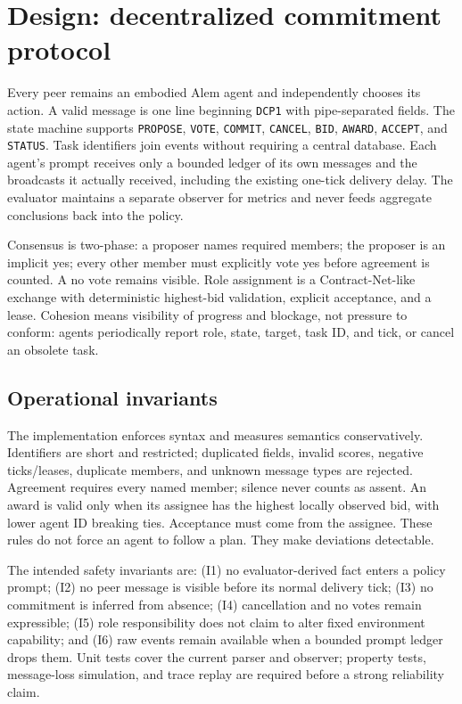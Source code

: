 \documentclass[11pt]{article}
\begin{document}
\section{Design: decentralized commitment protocol}
Every peer remains an embodied Alem agent and independently chooses its action. A valid message is one line beginning \texttt{DCP1} with pipe-separated fields. The state machine supports \texttt{PROPOSE}, \texttt{VOTE}, \texttt{COMMIT}, \texttt{CANCEL}, \texttt{BID}, \texttt{AWARD}, \texttt{ACCEPT}, and \texttt{STATUS}. Task identifiers join events without requiring a central database. Each agent's prompt receives only a bounded ledger of its own messages and the broadcasts it actually received, including the existing one-tick delivery delay. The evaluator maintains a separate observer for metrics and never feeds aggregate conclusions back into the policy.

Consensus is two-phase: a proposer names required members; the proposer is an implicit yes; every other member must explicitly vote yes before agreement is counted. A no vote remains visible. Role assignment is a Contract-Net-like exchange with deterministic highest-bid validation, explicit acceptance, and a lease. Cohesion means visibility of progress and blockage, not pressure to conform: agents periodically report role, state, target, task ID, and tick, or cancel an obsolete task.

\subsection{Operational invariants}
The implementation enforces syntax and measures semantics conservatively. Identifiers are short and restricted; duplicated fields, invalid scores, negative ticks/leases, duplicate members, and unknown message types are rejected. Agreement requires every named member; silence never counts as assent. An award is valid only when its assignee has the highest locally observed bid, with lower agent ID breaking ties. Acceptance must come from the assignee. These rules do not force an agent to follow a plan. They make deviations detectable.

The intended safety invariants are: (I1) no evaluator-derived fact enters a policy prompt; (I2) no peer message is visible before its normal delivery tick; (I3) no commitment is inferred from absence; (I4) cancellation and no votes remain expressible; (I5) role responsibility does not claim to alter fixed environment capability; and (I6) raw events remain available when a bounded prompt ledger drops them. Unit tests cover the current parser and observer; property tests, message-loss simulation, and trace replay are required before a strong reliability claim.
\end{document}
